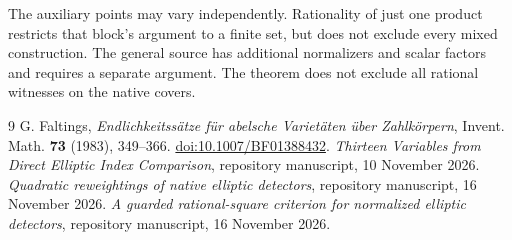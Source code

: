 \documentclass[11pt,a4paper]{article}
\begin{document}
The auxiliary points may vary independently. Rationality of just one
product restricts that block's argument to a finite set, but does not
exclude every mixed construction. The general source has additional
normalizers and scalar factors and requires a separate argument.
The theorem does not exclude all rational witnesses on the native covers.

\begin{thebibliography}{9}
\small
{} G. Faltings, \emph{Endlichkeitss\"atze f\"ur abelsche
Variet\"aten \"uber Zahlk\"orpern}, Invent. Math. \textbf{73} (1983),
349--366. \href{https://doi.org/10.1007/BF01388432}{doi:10.1007/BF01388432}.
 \emph{Thirteen Variables from Direct Elliptic
Index Comparison}, repository manuscript, 10 November 2026.
 \emph{Quadratic reweightings of native elliptic detectors}, repository
manuscript, 16 November 2026.
 \emph{A guarded rational-square criterion for normalized
elliptic detectors}, repository manuscript, 16 November 2026.
\end{thebibliography}
\end{document}
